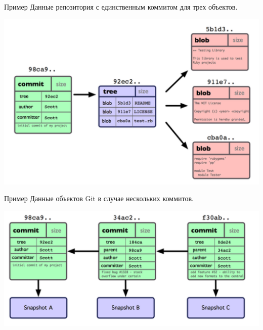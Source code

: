 \documentclass{beamer}
\begin{document}
\begin{frame}{Пример}
Данные репозитория с единственным коммитом для трех объектов. 
\begin{center}
\includegraphics[scale=0.7]{images/branch-02.png}
\end{center}
\end{frame}

\begin{frame}{Пример}
Данные объектов Git в случае нескольких коммитов. 
\begin{center}
\includegraphics[scale=0.7]{images/branch-03.png}
\end{center}
\end{frame}
\end{document}
